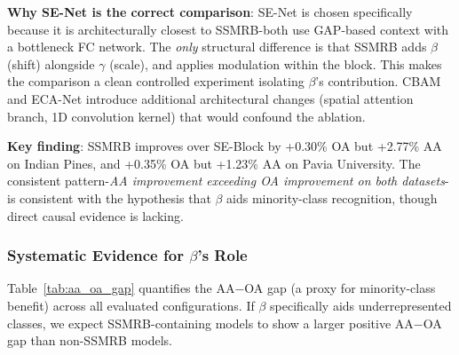 \documentclass[conference]{IEEEtran}
\begin{document}
\begin{table}[!t]
\caption{Scale-Only (SE-Net) vs. Affine (SSMRB) Modulation}
\label{tab:senet_comparison}
\centering
{}
\end{table}

\textbf{Why SE-Net is the correct comparison}: SE-Net is chosen specifically because it is architecturally closest to SSMRB-both use GAP-based context with a bottleneck FC network. The \textit{only} structural difference is that SSMRB adds $\beta$ (shift) alongside $\gamma$ (scale), and applies modulation within the block. This makes the comparison a clean controlled experiment isolating $\beta$'s contribution. CBAM~\cite{woo2018cbam} and ECA-Net introduce additional architectural changes (spatial attention branch, 1D convolution kernel) that would confound the ablation.

\textbf{Key finding}: SSMRB improves over SE-Block by +0.30\% OA but +2.77\% AA on Indian Pines, and +0.35\% OA but +1.23\% AA on Pavia University. The consistent pattern-\textit{AA improvement exceeding OA improvement on both datasets}-is consistent with the hypothesis that $\beta$ aids minority-class recognition, though direct causal evidence is lacking.

\subsubsection{Systematic Evidence for $\beta$'s Role}

Table~\ref{tab:aa_oa_gap} quantifies the AA$-$OA gap (a proxy for minority-class benefit) across all evaluated configurations. If $\beta$ specifically aids underrepresented classes, we expect SSMRB-containing models to show a larger positive AA$-$OA gap than non-SSMRB models.
\end{document}

